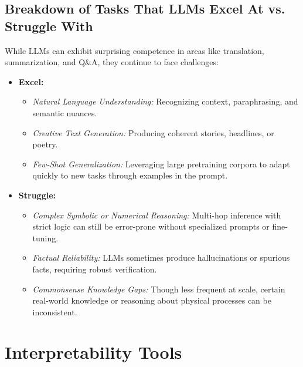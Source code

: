 \subsection{Breakdown of Tasks That LLMs Excel At vs. Struggle With}
\noindent
While LLMs can exhibit surprising competence in areas like translation, summarization, and Q\&A, they continue to face challenges:
\begin{itemize}
    \item \textbf{Excel:} 
    \begin{itemize}
        \item \emph{Natural Language Understanding:} Recognizing context, paraphrasing, and semantic nuances.
        \item \emph{Creative Text Generation:} Producing coherent stories, headlines, or poetry.
        \item \emph{Few-Shot Generalization:} Leveraging large pretraining corpora to adapt quickly to new tasks through examples in the prompt.
    \end{itemize}
    \item \textbf{Struggle:}
    \begin{itemize}
        \item \emph{Complex Symbolic or Numerical Reasoning:} Multi-hop inference with strict logic can still be error-prone without specialized prompts or fine-tuning.
        \item \emph{Factual Reliability:} LLMs sometimes produce hallucinations or spurious facts, requiring robust verification.
        \item \emph{Commonsense Knowledge Gaps:} Though less frequent at scale, certain real-world knowledge or reasoning about physical processes can be inconsistent.
    \end{itemize}
\end{itemize}


\section{Interpretability Tools}
\label{sec:interpretability_tools}

